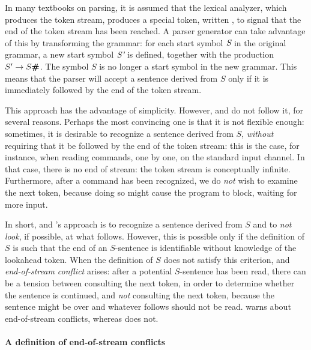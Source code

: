 \documentclass[onecolumn,11pt,nocopyrightspace,preprint]{sigplanconf}
\begin{document}
In many textbooks on parsing, it is assumed that the lexical analyzer, which
produces the token stream, produces a special token, written \eos, to signal
that the end of the token stream has been reached. A parser generator can take
advantage of this by transforming the grammar: for each start symbol $\textit{S}$
in the original grammar, a new start symbol $\textit{S'}$ is defined, together
with the production $S'\rightarrow S\text{\upshape\sf\bfseries \#}$. The symbol $S$ is no longer a start
symbol in the new grammar. This means that the parser will accept a sentence
derived from $S$ only if it is immediately followed by the end of the token
stream.

This approach has the advantage of simplicity. However, \ocamlyacc and \menhir
do not follow it, for several reasons. Perhaps the most convincing one is that
it is not flexible enough: sometimes, it is desirable to recognize a sentence
derived from $S$, \emph{without} requiring that it be followed by the end of
the token stream: this is the case, for instance, when reading commands, one
by one, on the standard input channel. In that case, there is no end of stream:
the token stream is conceptually infinite. Furthermore, after a command has
been recognized, we do \emph{not} wish to examine the next token, because
doing so might cause the program to block, waiting for more input.

In short, \ocamlyacc and \menhir's approach is to recognize a sentence derived
from $S$ and to \emph{not look}, if possible, at what follows. However, this
is possible only if the definition of $S$ is such that the end of an
$S$-sentence is identifiable without knowledge of the lookahead token. When
the definition of $S$ does not satisfy this criterion, and \emph{end-of-stream
conflict} arises: after a potential $S$-sentence has been read, there can be a
tension between consulting the next token, in order to determine whether the
sentence is continued, and \emph{not} consulting the next token, because the
sentence might be over and whatever follows should not be read. \menhir warns
about end-of-stream conflicts, whereas \ocamlyacc does not.

\paragraph{A definition of end-of-stream conflicts}
\end{document}
